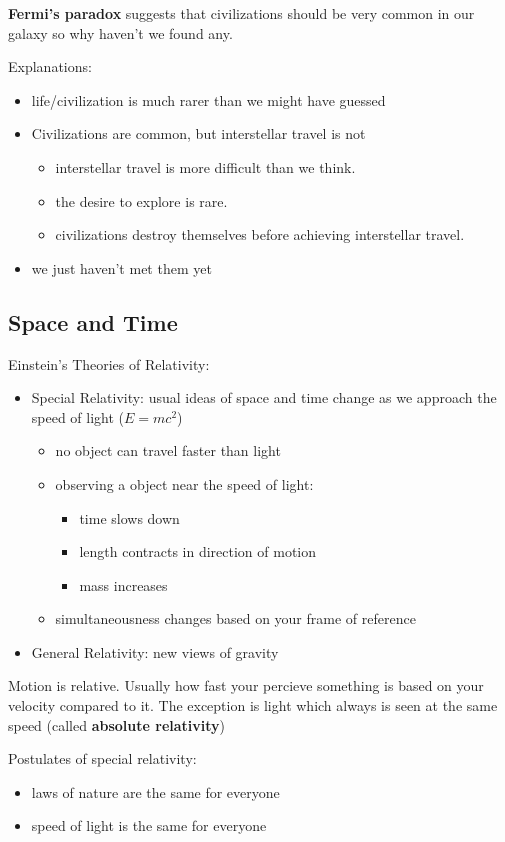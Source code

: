 \documentclass[12pt]{article}
\begin{document}
\textbf{Fermi's paradox} suggests that civilizations should be very common in our galaxy so why haven't we found any.

Explanations:
\begin{itemize}
\item  life/civilization is much rarer than we might have guessed
\item Civilizations are common, but interstellar travel is not
\begin{itemize}
\item interstellar travel is more difficult than we think.
\item the desire to explore is rare.
\item civilizations destroy themselves before achieving interstellar travel.
\end{itemize}
\item we just haven't met them yet
\end{itemize}

\subsection{Space and Time}
Einstein's Theories of Relativity:
\begin{itemize}
\item Special Relativity: usual ideas of space and time change as we approach the speed of light ($E = mc^2$)
\begin{itemize}
\item no object can travel faster than light
\item observing a object near the speed of light:
\begin{itemize}
\item time slows down
\item length contracts in direction of motion
\item mass increases
\end{itemize}
\item simultaneousness changes based on your frame of reference
\end{itemize}
\item General Relativity: new views of gravity
\end{itemize}

Motion is relative. Usually how fast your percieve something is based on your velocity compared to it. The exception is light which always is seen at the same speed (called \textbf{absolute relativity})

Postulates of special relativity:
\begin{itemize}
\item laws of nature are the same for everyone
\item speed of light is the same for everyone
\end{itemize}
\end{document}

